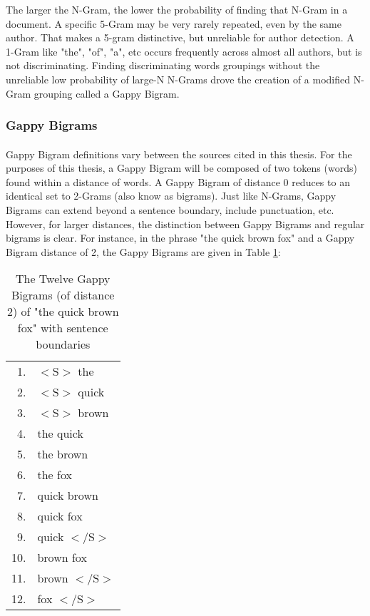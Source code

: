 		The larger the N-Gram, the lower the probability of finding that N-Gram in a document.  A specific 5-Gram may be very rarely repeated, even by the same author.  That makes a 5-gram distinctive, but unreliable for author detection.  A 1-Gram like "the", "of", "a", etc occurs frequently across almost all authors, but is not discriminating.  Finding discriminating words groupings without the unreliable low probability of large-N N-Grams drove the creation of a modified N-Gram grouping called a Gappy Bigram.

	\subsubsection{Gappy Bigrams}
		\paragraph{} Gappy Bigram definitions vary between the sources cited in this thesis.  For the purposes of this thesis, a Gappy Bigram will be composed of two tokens (words) found within a distance of words.  A Gappy Bigram of distance 0 reduces to an identical set to 2-Grams (also know as bigrams). Just like N-Grams, Gappy Bigrams can extend beyond a sentence boundary, include punctuation, etc. However, for larger distances, the distinction between Gappy Bigrams and regular bigrams is clear. For instance, in the phrase "the quick brown fox" and a Gappy Bigram distance of 2, the Gappy Bigrams are given in Table \ref{table:2gappybigrams}:
		\begin{center}
			\begin{table}[h]
				\begin{center}
					\begin{tabular}{ r l}
					1. &  $<\text{S}>$ the\\
					2. &  $<\text{S}>$ quick\\
					3. &  $<\text{S}>$ brown\\
					4. &  the quick\\
					5. &  the brown\\
					6. &  the fox\\
					7. &  quick brown\\
					8. &  quick fox\\
					9. &  quick $<\text{/S}>$\\
					10.&  brown fox\\
					11.&  brown $<\text{/S}>$\\
					12.&  fox $<\text{/S}>$\\
					\end{tabular}
					\caption{The Twelve Gappy Bigrams (of distance 2) of "the quick brown fox" with sentence boundaries}
					\label{table:2gappybigrams}
				\end{center}
			\end{table}
		\end{center}
		
